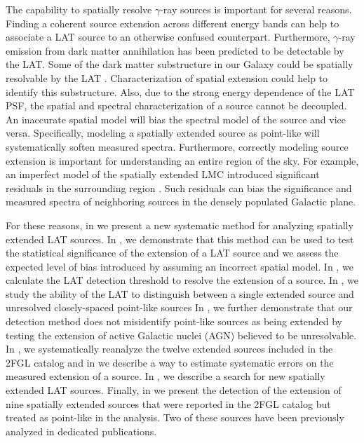 The capability to spatially resolve \gev $\gamma$-ray sources is
important for several reasons.  Finding a coherent source extension
across different energy bands can help to associate a LAT source to an
otherwise confused counterpart.  Furthermore, $\gamma$-ray emission from
dark matter annihilation has been predicted to be detectable by the LAT.
Some of the dark matter substructure in our Galaxy could be spatially
resolvable by the LAT \citep{baltz_2008a_pre-launch-estimates}.
Characterization of spatial extension could help to identify this
substructure.  Also, due to the strong energy dependence of the LAT
PSF, the spatial and spectral characterization of a source cannot be
decoupled. An inaccurate spatial model will bias the spectral model of the
source and vice versa. Specifically, modeling a spatially extended source
as point-like will systematically soften measured spectra. Furthermore,
correctly modeling source extension is important for understanding an
entire region of the sky. For example, an imperfect model of the spatially
extended LMC introduced significant residuals in the surrounding region
\citep{abdo_2010b_fermi-large,nolan_2012_fermi-large}.  Such residuals
can bias the significance and measured spectra of neighboring sources
in the densely populated Galactic plane.

 For these reasons, in 
we present a new systematic method for analyzing spatially extended LAT
sources.  In , we demonstrate that this method
can be used to test the statistical significance of the extension of a LAT
source and we assess the expected level of bias introduced by assuming
an incorrect spatial model.  In ,
we calculate the LAT detection threshold to resolve the extension
of a source.  In , we study
the ability of the LAT to distinguish between a single extended
source and unresolved closely-spaced point-like sources In
, we further demonstrate that our
detection method does not misidentify point-like sources as being
extended by testing the extension of active Galactic nuclei (AGN)
believed to be unresolvable.  In , we
systematically reanalyze the twelve extended sources included in the
2FGL catalog and in 
we describe a way to estimate systematic errors on the measured
extension of a source.  In ,
we describe a search for new spatially extended LAT sources. Finally,
in  we present the detection of the
extension of nine spatially extended sources that were reported in the
2FGL catalog but treated as point-like in the analysis.  Two of these
sources have been previously analyzed in dedicated publications.



